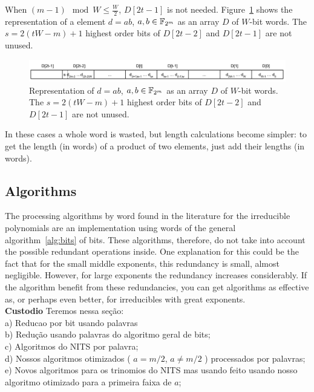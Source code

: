 When $(m-1) \mod{W} \leq \frac{W}{2}$, $D[2t-1]$ is not needed.  Figure~\ref{fig:elemento:field:mult2} shows the representation of a element $d = ab$, $a,b \in {\mathbb F}_{2^m}$ as an array $D$ of $W$-bit words. The $s = 2(tW-m)+1$ highest order bits of $D[2t-2]$ and $D[2t-1]$ are not unused.
\begin{figure}[htb]
  \centering
  \includegraphics[width = \columnwidth]{figures/two-word-element-2.pdf}
\caption{Representation of $d = ab$, $a,b \in {\mathbb F}_{2^m}$ as an array $D$ of $W$-bit words. The $s = 2(tW-m)+1$ highest order bits of $D[2t-2]$ and $D[2t-1]$ are not unused.}
\label{fig:elemento:field:mult2}
\end{figure}

In these cases a whole word is wasted, but length calculations become simpler: to get the length (in words) of a product of two elements, just add their lengths (in words).

\subsection{Algorithms}
The processing algorithms by word found in the literature for the irreducible polynomials are an implementation using words of the general algorithm~\ref{alg:bits} of bits. These algorithms, therefore, do not take into account the possible redundant operations inside. One explanation for this could be the fact that for the small middle exponents, this redundancy is small, almost negligible. However, for large exponents the redundancy increases considerably. If the algorithm benefit from these redundancies, you can get algorithms as effective as, or perhaps even better, for irreducibles with great exponents. \\

{\bf Custodio} Teremos nessa seção: \\
a) Reducao por bit usando palavras\\
b) Redução usando palavras do algoritmo geral de bits;\\
c) Algoritmos do NITS por palavra;\\
d) Nossos algoritmos otimizados ( $a=m/2$, $a \neq m/2$ ) processados por palavras;\\
e) Novos algoritmos para os trinomios do NITS mas usando feito usando nosso algoritmo otimizado para a primeira faixa de $a$;\\
 

